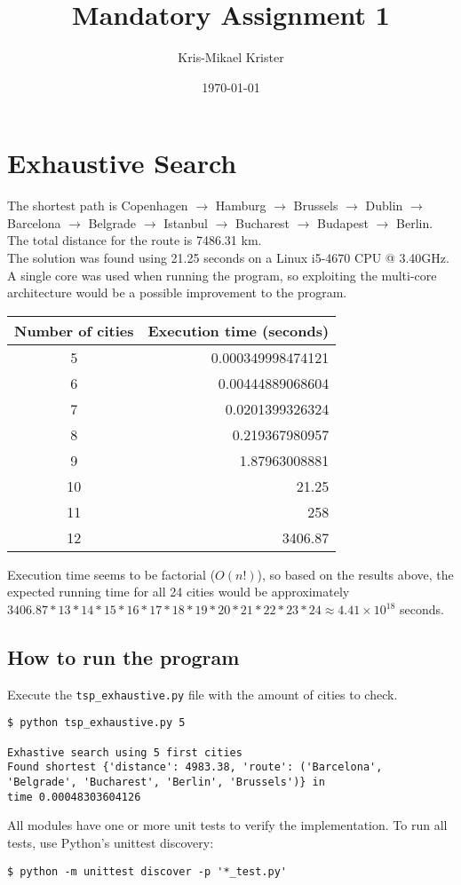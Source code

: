 \documentclass{article}
\title{Mandatory Assignment 1}
\author{Kris-Mikael Krister}
\date{\today}
\begin{document}
\maketitle
\section*{Exhaustive Search}

The shortest path is Copenhagen $\rightarrow$ Hamburg $\rightarrow$ Brussels $\rightarrow$ Dublin $\rightarrow$ Barcelona $\rightarrow$ Belgrade $\rightarrow$ Istanbul $\rightarrow$ Bucharest $\rightarrow$ Budapest $\rightarrow$ Berlin. The total distance for the route is 7486.31 km.\\

\noindent The solution was found using 21.25 seconds on a Linux i5-4670 CPU @ 3.40GHz. A single core was used when running the program, so exploiting the multi-core architecture would be a possible improvement to the program.\\

\begin{center}
\begin{tabular}{cr}
\toprule
Number of cities & Execution time (seconds) \\
\midrule
5 & 0.000349998474121 \\
6 & 0.00444889068604 \\
7 & 0.0201399326324 \\
8 & 0.219367980957 \\
9 & 1.87963008881 \\
10 & 21.25 \\
11 & 258 \\
12 & 3406.87 \\
\bottomrule
\end{tabular}
\end{center}

\noindent Execution time seems to be factorial ($O(n!)$), so based on the results above, the expected running time for all 24 cities would be approximately $3406.87 * 13 * 14 * 15 * 16 * 17 * 18 * 19 * 20 * 21 * 22 * 23 * 24 \approx 4.41 \times 10^{18}$ seconds.

\subsection*{How to run the program}

Execute the \texttt{tsp\_exhaustive.py} file with the amount of cities to check.

\begin{verbatim}
$ python tsp_exhaustive.py 5

Exhastive search using 5 first cities
Found shortest {'distance': 4983.38, 'route': ('Barcelona',
'Belgrade', 'Bucharest', 'Berlin', 'Brussels')} in
time 0.00048303604126
\end{verbatim}

\noindent All modules have one or more unit tests to verify the implementation. To run all tests, use Python's unittest discovery:

\begin{verbatim}
$ python -m unittest discover -p '*_test.py'
\end{verbatim}
\end{document}
